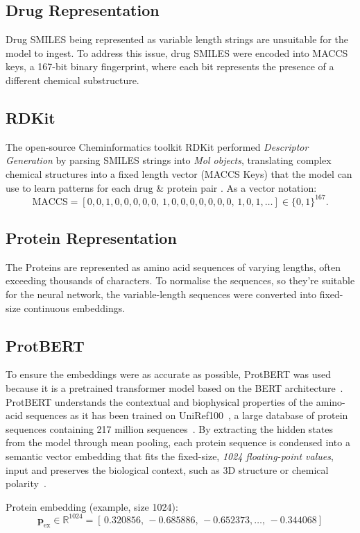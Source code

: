 \subsection{Drug Representation}
Drug SMILES being represented as variable length strings are unsuitable for the model to ingest.
To address this issue, drug SMILES were encoded into MACCS keys, a 167-bit binary fingerprint, where each bit represents the presence of a different chemical substructure.
\subsection{RDKit}
The open-source Cheminformatics toolkit RDKit performed \textit{Descriptor Generation} by parsing SMILES strings into \textit{Mol objects}, translating complex chemical structures into a fixed length vector (MACCS Keys) that the model can use to learn patterns for each drug \& protein pair \citep{rdkit_doc}.
As a vector notation:
\[
\text{MACCS} = [0,0,1,0,0,0,0,0,\,1,0,0,0,0,0,0,0,\,1,0,1,\dots] \in \{0,1\}^{167}.
\]
\subsection{Protein Representation} 
The Proteins are represented as amino acid sequences of varying lengths, often exceeding thousands of characters.
To normalise the sequences, so they're suitable for the neural network, the variable-length sequences were converted into fixed-size continuous embeddings.
\subsection{ProtBERT}
To ensure the embeddings were as accurate as possible, ProtBERT was used because it is a pretrained transformer model based on the BERT architecture~\citep{devlin2019bertpretrainingdeepbidirectional}.
ProtBERT understands the contextual and biophysical properties of the amino-acid sequences as it has been trained on UniRef100~\citep{UniProt2025}, a large database of protein sequences containing 217 million sequences~\citep{Elnaggar2020.07.12.199554}.
By extracting the hidden states from the model through mean pooling, each protein sequence is condensed into a semantic vector embedding that fits the fixed-size, \textit{1024 floating-point values}, input and preserves the biological context, such as 3D structure or chemical polarity~\citep{Elnaggar2020.07.12.199554}.

Protein embedding (example, size 1024):
\[
\mathbf{p}_{\text{ex}} \in \mathbb{R}^{1024} =
[\,0.320856,\,-0.685886,\,-0.652373,\ldots,\,-0.344068]
\]

